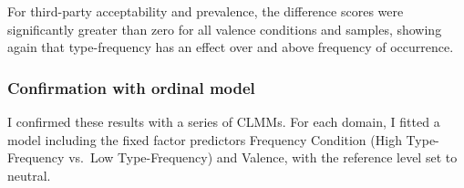 \documentclass[
]{article}
\begin{document}
For third-party acceptability and prevalence, the difference scores were significantly greater than zero for all valence conditions and samples, showing again that type-frequency has an effect over and above frequency of occurrence.

\clearpage

\subsubsection{Confirmation with ordinal model}\label{confirmation-with-ordinal-model-1}

I confirmed these results with a series of CLMMs. For each domain, I fitted a model including the fixed factor predictors Frequency Condition (High Type-Frequency vs.~Low Type-Frequency) and Valence, with the reference level set to neutral.
\end{document}

